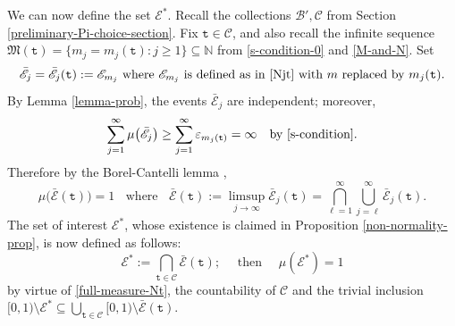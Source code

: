 \documentclass[12pt, twoside]{article}
\theoremstyle{definition}
\numberwithin{equation}{section}
\begin{document}
\vskip0.1in  
\noindent We can now define the set $\mathscr{E}^{\ast}$. Recall the collections $\mathscr{B}', \mathscr{C}$ from Section \ref{preliminary-Pi-choice-section}.  Fix $\mathtt t \in \mathscr{C}$, and also recall the infinite sequence $\mathfrak M(\mathtt t) = \{m_j = m_j(\mathtt t) : j \geq 1\} \subseteq \mathbb N$ from \eqref{s-condition-0} and \eqref{M-and-N}. Set 
\[ \bar{\mathscr{E}}_j = \bar{\mathscr{E}}_j(\mathtt t) := \mathscr E_{m_j} \text{ where $ \mathscr E_{m_j}$ is defined as in \eqref{Njt} with $m$ replaced by $m_j(\mathtt t)$}. \] By Lemma \ref{lemma-prob}, the events $\bar{\mathscr{E}}_j$ are independent; moreover, 
\[ \sum_{j=1}^{\infty} \mu\bigl(\bar{\mathscr{E}}_j \bigr) \geq \sum_{j=1}^{\infty} \varepsilon_{m_j(\mathtt t)} = \infty \quad \text{by \eqref{s-condition}}.  \]  
Therefore by the Borel-Cantelli lemma \cite[Theorem 2.3.6]{d10}, 
\begin{equation} \label{full-measure-Nt} 
\mu \bigl(\bar{\mathscr E}(\mathtt t) \bigr)= 1 \; \; \text{ where } \; \; \bar{\mathscr{E}}(\mathtt t) := \limsup_{j \rightarrow \infty} \bar{\mathscr{E}}_j(\mathtt t) = \bigcap_{\ell=1}^{\infty} \bigcup_{j=\ell}^{\infty} \bar{\mathscr{E}}_j(\mathtt t).   
\end{equation} 
The set of interest $\mathscr{E}^{\ast}$, whose existence is claimed in Proposition \ref{non-normality-prop}, is now defined as follows: 
\begin{equation} \label{full-measure-N-star}
\mathscr{E}^{\ast} := \bigcap_{\mathtt t \in \mathscr{C}} \bar{\mathscr{E}}(\mathtt t); \quad \text{ then } \quad \mu(\mathscr{E}^{\ast}) = 1 
\end{equation} 
by virtue of \eqref{full-measure-Nt}, the countability of $\mathscr{C}$ and the trivial inclusion $[0,1) \setminus \mathscr{E}^{\ast} \subseteq \bigcup_{\mathtt t \in \mathscr{C}} [0,1) \setminus \bar{\mathscr{E}}(\mathtt t)$.     
\end{document}
